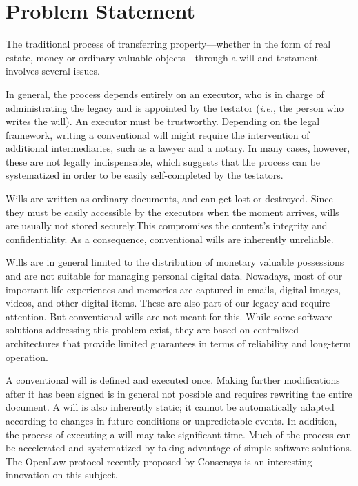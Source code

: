 \section{Problem Statement} %
\label{sec:problem_statement}

The traditional process of transferring property---whether in the form of real estate, money or ordinary valuable objects---through a will and testament involves several issues.

In general, the process depends entirely on an executor, who is in charge of administrating the legacy and is appointed by the testator (\textit{i.e.}, the person who writes the will). An executor must be trustworthy. Depending on the legal framework, writing a conventional will might require the intervention of additional intermediaries, such as a lawyer and a notary. In many cases, however, these are not legally indispensable, which suggests that the process can be systematized in order to be easily self-completed by the testators. 

Wills are written as ordinary documents, and can get lost or destroyed. Since they must be easily accessible by the executors when the moment arrives, wills are usually not stored securely.This compromises the content's integrity and confidentiality. As a consequence, conventional wills are inherently unreliable.

Wills are in general limited to the distribution of monetary valuable possessions and are not suitable for managing personal digital data. Nowadays, most of our important life experiences and memories are captured in emails, digital images, videos, and other digital items. These are also part of our legacy and require attention. But conventional wills are not meant for this. While some software solutions addressing this problem exist, they are based on centralized architectures that provide limited guarantees in terms of reliability and long-term operation.

A conventional will is defined and executed once. Making further modifications after it has been signed is in general not possible and requires rewriting the entire document. A will is also inherently static; it cannot be automatically adapted according to changes in future conditions or unpredictable events. In addition, the process of executing a will may take significant time. Much of the process can be accelerated and systematized by taking advantage of simple software solutions. 
The OpenLaw protocol recently proposed by Consensys \cite{OpenLaw} is an interesting innovation on this subject. 

